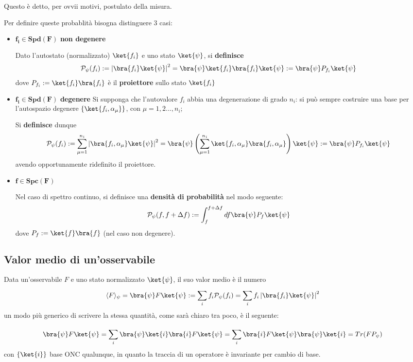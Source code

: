 Questo è detto, per ovvii motivi, postulato della misura.

Per definire queste probablità bisogna distinguere 3 casi:

\begin{itemize}
    \item $\mathbf{f_i \in Spd(F)}$ \textbf{non degenere}
    
	Dato l'autostato (normalizzato) $\ket{f_i}$ e uno stato $\ket{\psi}$, si \textbf{definisce}	
	$$\mathcal{P}_{\psi}(f_i):= \left| \bra{f_i}\ket{\psi} \right|^2 =
	\bra{\psi}\ket{f_i}\bra{f_i}\ket{\psi} := \bra{\psi}P_{f_i}\ket{\psi}$$
	dove $P_{f_i} := \ket{f_i}\bra{f_i}$ è il \textbf{proiettore} sullo stato $\ket{f_i}$

    \item $\mathbf{f_i \in Spd(F)}$ \textbf{degenere}
	Si supponga che l'autovalore $f_i$ abbia una degenerazione di grado $n_i$:
	si può sempre costruire una base per l'autospazio degenere $\left\{\ket{f_i,\alpha_\mu}\right\}$,
	con $\mu = 1,2...,n_i$;

	Si \textbf{definisce} dunque
	$$\mathcal{P}_\psi(f_i):=\sum_{\mu=1}^{n_i}\left|\bra{f_i,\alpha_\mu}\ket{\psi}\right|^2
	= \bra{\psi}\left(\sum_{\mu=1}^{n_i}\ket{f_i,\alpha_\mu}\bra{f_i,\alpha_\mu} \right)\ket{\psi}:=
	\bra{\psi}P_{f_i}\ket{\psi}$$
	avendo opportunamente ridefinito il proiettore.
    \item $\mathbf{f\in Spc(F)}$

	Nel caso di spettro continuo, si definisce una \textbf{densità di probabilità} nel modo seguente:
	$$\mathcal{P}_\psi(f,f+\Delta f) := \int_{f}^{f+\Delta f}df \bra{\psi}P_f\ket{\psi}$$
	dove $P_f:=\ket{f}\bra{f}$ (nel caso non degenere).	
\end{itemize}

\subsection{Valor medio di un'osservabile}
Data un'osservabile $F$ e uno stato normalizzato $\ket{\psi}$, il suo valor medio è il numero
$$\langle F \rangle_\psi = \bra{\psi}F\ket{\psi} := \sum_{i}^{}f_i\mathcal{P}_\psi(f_i) =
\sum_{i}^{}f_i\left| \bra{f_i}\ket{\psi} \right|^2$$
un modo più generico di scrivere la stessa quantità, come sarà chiaro tra poco, è il seguente:

$$
\bra{\psi}F\ket{\psi} = \sum_{i}^{}\bra{\psi}\ket{i}\bra{i}F\ket{\psi} =
\sum_{i}^{}\bra{i}F\ket{\psi}\bra{\psi}\ket{i} = Tr(FP_{\psi})
$$
con $\left\{\ket{i}\right\}$ base ONC qualunque, in quanto la traccia di un operatore è invariante per
cambio di base.

